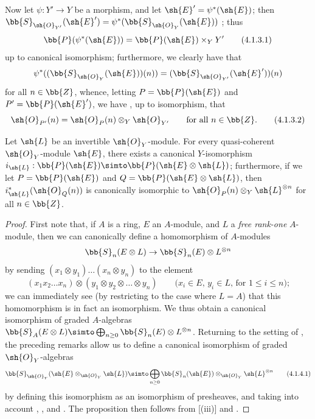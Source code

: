 \begin{env}[4.1.3]
\label{II.4.1.3}
Now let $\psi:Y'\to Y$ be a morphism, and let $\sh{E}'=\psi^*(\sh{E})$;
then $\bb{S}_{\sh{O}_{Y'}}(\sh{E}') = \psi^*(\bb{S}_{\sh{O}_Y}(\sh{E}))$ ;
thus 
\[
\label{II.4.1.3.1}
  \bb{P}(\psi^*(\sh{E})) = \bb{P}(\sh{E})\times_Y Y'
  \tag{4.1.3.1}
\]
up to canonical isomorphism;
furthermore, we clearly have that
\[
  \psi^*((\bb{S}_{\sh{O}_Y}(\sh{E}))(n)) = (\bb{S}_{\sh{O}_{Y'}}(\sh{E}'))(n)
\]
for all $n\in\bb{Z}$, whence, letting $P=\bb{P}(\sh{E})$ and $P'=\bb{P}(\sh{E}')$, we have , up to isomorphism, that
\[
\label{II.4.1.3.2}
  \sh{O}_{P'}(n) = \sh{O}_P(n)\otimes_Y\sh{O}_{Y'}
  \qquad\mbox{for all $n\in\bb{Z}$.}
  \tag{4.1.3.2}
\]
\end{env}

\begin{proposition}[4.1.4]
\label{II.4.1.4}
Let $\sh{L}$ be an invertible $\sh{O}_Y$-module.
For every quasi-coherent $\sh{O}_Y$-module $\sh{E}$, there exists a canonical $Y$-isomorphism $i_\sh{L}:\bb{P}(\sh{E})\simto\bb{P}(\sh{E}\otimes\sh{L})$;
furthermore, if we let $P=\bb{P}(\sh{E})$ and $Q=\bb{P}(\sh{E}\otimes\sh{L})$, then $i_\sh{L}^*(\sh{O}_Q(n))$ is canonically isomorphic to $\sh{O}_P(n)\otimes_Y\sh{L}^{\otimes n}$ for all $n\in\bb{Z}$.
\end{proposition}

\begin{proof}
First note that, if $A$ is a ring, $E$ an $A$-module, and $L$ a \emph{free rank-one} $A$-module, then we can canonically define a homomorphism of $A$-modules
\[
  \bb{S}_n(E\otimes L) \to \bb{S}_n(E)\otimes L^{\otimes n}
\]
by sending $(x_1\otimes y_1)\ldots(x_n\otimes y_n)$ to the element
\[
  (x_1x_2\ldots x_n)\otimes(y_1\otimes y_2\otimes\ldots\otimes y_n)
  \qquad\mbox{($x_i\in E$, $y_i\in L$, for $1\leq i\leq n$);}
\]
we can immediately see (by restricting to the case where $L=A$) that this homomorphism is in fact an isomorphism.
We thus obtain a canonical isomorphism of graded $A$-algebras $\bb{S}_A(E\otimes L)\simto\bigoplus_{n\geq0}\bb{S}_n(E)\otimes L^{\otimes n}$.
Returning to the setting of , the preceding remarks allow us to define a canonical isomorphism of graded $\sh{O}_Y$-algebras
\[
\label{II.4.1.4.1}
  \bb{S}_{\sh{O}_Y}(\sh{E}\otimes_{\sh{O}_Y}\sh{L}) \simto \bigoplus_{n\geq0}\bb{S}_n(\sh{E})\otimes_{\sh{O}_Y}\sh{L}^{\otimes n}
  \tag{4.1.4.1}
\]
by defining this isomorphism as an isomorphism of presheaves, and taking into account , , and .
The proposition then follows from [(iii)] and .
\end{proof}

